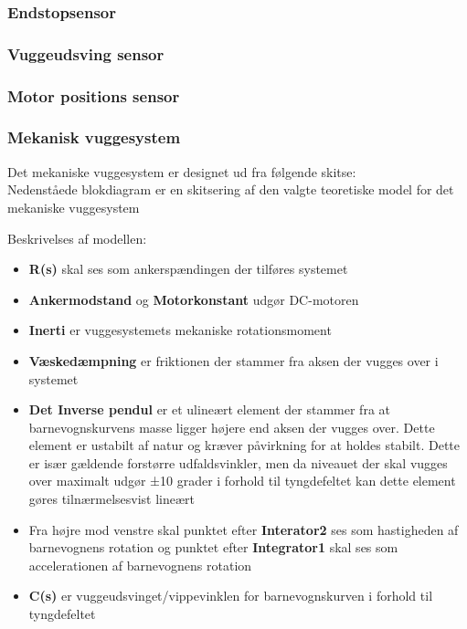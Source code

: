 \subsubsection{Endstopsensor}

\subsubsection{Vuggeudsving sensor}

\subsubsection{Motor positions sensor}

\subsubsection{Mekanisk vuggesystem}
Det mekaniske vuggesystem er designet ud fra følgende skitse: \\



Nedenståede blokdiagram er en skitsering af den valgte teoretiske model for det mekaniske vuggesystem


Beskrivelses af modellen:
\begin{itemize}
\item \textbf{R(s)} skal ses som ankerspændingen der tilføres systemet
\item \textbf{Ankermodstand} og \textbf{Motorkonstant} udgør DC-motoren
\item \textbf{Inerti} er vuggesystemets mekaniske rotationsmoment
\item \textbf{Væskedæmpning} er friktionen der stammer fra aksen der vugges over i systemet
\item \textbf{Det Inverse pendul} er et ulineært element der stammer fra at barnevognskurvens masse ligger højere end aksen der vugges over. Dette element er ustabilt af natur og kræver påvirkning for at holdes stabilt. Dette er især gældende forstørre udfaldsvinkler, men da niveauet der skal vugges over maximalt udgør ±10 grader i forhold til tyngdefeltet kan dette element gøres tilnærmelsesvist lineært
\item Fra højre mod venstre skal punktet efter \textbf{Interator2} ses som hastigheden af barnevognens rotation og punktet efter \textbf{Integrator1} skal ses som accelerationen af barnevognens rotation
\item \textbf{C(s)} er vuggeudsvinget/vippevinklen for barnevognskurven i forhold til tyngdefeltet

\end{itemize}

